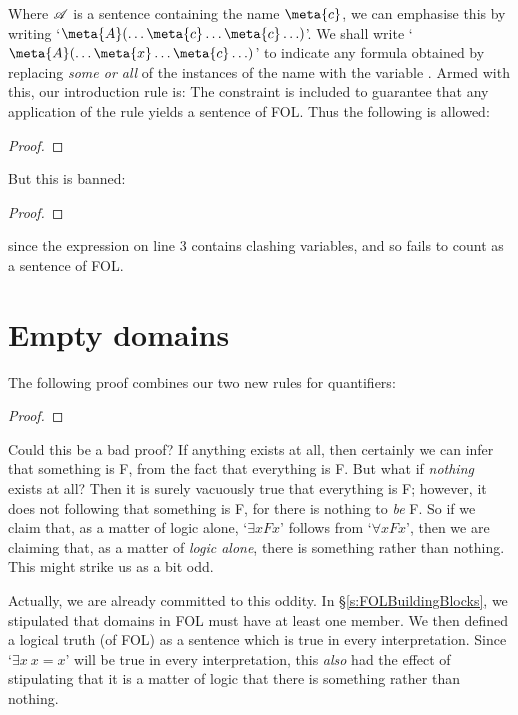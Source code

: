 Where $\mathscr{A}$ is a sentence containing the name $\meta{c}$, we can emphasise this by writing `$\meta{A}(\ldots \meta{c} \ldots \meta{c}\ldots)$'. We shall write `$\meta{A}(\ldots \meta{x} \ldots \meta{c}\ldots)$' to indicate any formula obtained by replacing \emph{some or all} of the instances of the name  with the variable . Armed with this, our introduction rule is:
The constraint is included to guarantee that any application of the rule yields a  sentence of FOL. Thus the following is allowed:
\begin{proof}
	 
	 
\end{proof}
But this is banned:
\begin{proof}
	 
\end{proof}
since the expression on line 3 contains clashing variables, and so fails to count as a sentence of FOL.

\section{Empty domains}
The following proof combines our two new rules for quantifiers:
	\begin{proof}
	\end{proof}
Could this be a bad proof? If anything exists at all, then certainly we can infer that something is F, from the fact that everything is F. But what if \emph{nothing} exists at all? Then it is surely vacuously true that everything is F; however, it does not following that something is F, for there is nothing to \emph{be} F. So if we claim that, as a matter of logic alone, `$\exists x Fx$' follows from `$\forall x Fx$', then we are claiming that, as a matter of \emph{logic alone}, there is something rather than nothing. This might strike us as a bit odd.

Actually, we are already committed to this oddity. In \S\ref{s:FOLBuildingBlocks}, we stipulated that domains in FOL must have at least one member. We then defined a logical truth (of FOL) as a sentence which is true in every interpretation. Since `$\exists x\ x=x$' will be true in every interpretation, this \emph{also} had the effect of stipulating that it is a matter of logic that there is something rather than nothing.

